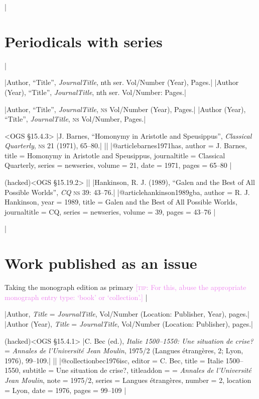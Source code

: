 \documentclass[extrafontsizes,11pt,a4paper,oneside]{memoir}
\newcommand*{\lit}[1]{\textsf{#1}}
\newcommand*{\code}[1]{`\textsf{#1}'}
\newcommand*{\aside}[1]{\textcolor{violet}{[\textsc{tip:} #1]}}
\begin{document}
\todoc|
\section{Periodicals with series}
|

\specs
|Author, \enquote{Title}, \emph{JournalTitle}, nth \lit{ser}. Vol/Number (Year), Pages.|%
|Author (Year), \enquote{Title}, \emph{JournalTitle}, nth \lit{ser}. Vol/Number: Pages.|

\specs
|Author, \enquote{Title}, \emph{JournalTitle}, \textsc{ns} Vol/Number (Year), Pages.|%
|Author (Year), \enquote{Title}, \emph{JournalTitle}, \textsc{ns} Vol/Number, Pages.|

\bibexample<OGS \S15.4.3>
|J. Barnes, \enquote{Homonymy in Aristotle and Speusippus}, \emph{Classical Quarterly}, \textsc{ns} 21 (1971), 65--80.|%
||%
|@article{barnes1971has,
  author = {J. Barnes},
  title = {Homonymy in Aristotle and Speusippus},
  journaltitle = {Classical Quarterly},
  series = {newseries},
  volume = {21},
  date = {1971},
  pages = {65--80}
}|

\bibexample(hacked)<OGS \S15.19.2>
||%
|Hankinson, R. J. (1989), \enquote{Galen and the Best of All Possible Worlds}, \emph{CQ} \textsc{ns} 39: 43–76.|%
|@article{hankinson1989gba,
  author = {R. J. Hankinson},
  year = {1989},
  title = {Galen and the Best of All Possible Worlds},
  journaltitle = {CQ\nopunct},
  series = {newseries},
  volume = {39},
  pages = {43–76}
}|

\todoc|
\section{Work published as an issue}

Taking the monograph edition as primary \aside{For this, abuse the appropriate monograph entry type: \code{book} or \code{collection}.}
|

\specs
|Author, \emph{Title} = \emph{JournalTitle}, Vol/Number (Location: Publisher, Year), pages.|%
|Author (Year), \emph{Title} = \emph{JournalTitle}, Vol/Number (Location: Publisher), pages.|

\bibexample(hacked)<OGS \S15.4.1>
|C. Bec (ed.), \emph{Italie 1500--1550: Une situation de crise?} = \emph{Annales de l'Université Jean Moulin}, 1975/2 (Langues étrangères, 2; Lyon, 1976), 99--109.|%
||%
|@collection{bec1976isc,
  editor = {C. Bec},
  title = {Italie 1500--1550},
  subtitle = {Une situation de crise?\nopunct},
  titleaddon = {= \emph{Annales de l'Université Jean Moulin}},
  note = {1975/2},
  series = {Langues étrangères},
  number = {2},
  location = {Lyon},
  date = {1976},
  pages = {99--109}
}|
  
\end{document}
